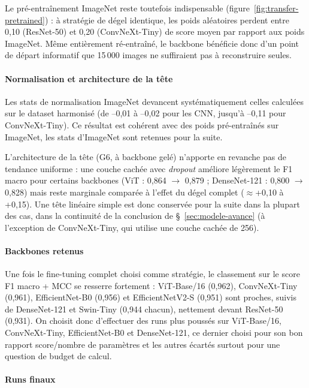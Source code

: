 Le pré-entraînement ImageNet reste toutefois indispensable (figure~\ref{fig:transfer-pretrained}) : à stratégie de dégel identique, les poids aléatoires perdent entre 0,10 (ResNet-50) et 0,20 (ConvNeXt-Tiny) de score moyen par rapport aux poids ImageNet.
Même entièrement ré-entraîné, le backbone bénéficie donc d'un point de départ informatif que 15\,000 images ne suffiraient pas à reconstruire seules.

\paragraph{Normalisation et architecture de la tête}

Les stats de normalisation ImageNet devancent systématiquement celles calculées sur le dataset harmonisé (de --0,01 à --0,02 pour les CNN, jusqu'à --0,11 pour ConvNeXt-Tiny).
Ce résultat est cohérent avec des poids pré-entraînés sur ImageNet, les stats d'ImageNet sont retenues pour la suite.

L'architecture de la tête (G6, à backbone gelé) n'apporte en revanche pas de tendance uniforme : une couche cachée avec \emph{dropout} améliore légèrement le F1 macro pour certains backbones (ViT : 0,864 $\to$ 0,879 ; DenseNet-121 : 0,800 $\to$ 0,828) mais reste marginale comparée à l'effet du dégel complet ($\approx$+0,10 à +0,15).
Une tête linéaire simple est donc conservée pour la suite dans la plupart des cas, dans la continuité de la conclusion de \S~\ref{sec:modele-avance} (à l'exception de ConvNeXt-Tiny, qui utilise une couche cachée de 256).

\paragraph{Backbones retenus}

Une fois le fine-tuning complet choisi comme stratégie, le classement sur le score F1 macro + MCC se resserre fortement : ViT-Base/16 (0,962), ConvNeXt-Tiny (0,961), EfficientNet-B0 (0,956) et EfficientNetV2-S (0,951) sont proches, suivis de DenseNet-121 et Swin-Tiny (0,944 chacun), nettement devant ResNet-50 (0,931).
On choisit donc d'effectuer des runs plus poussés sur ViT-Base/16, ConvNeXt-Tiny, EfficientNet-B0 et DenseNet-121, ce dernier choisi pour son bon rapport score/nombre de paramètres et les autres écartés surtout pour une question de budget de calcul.

\paragraph{Runs finaux}

